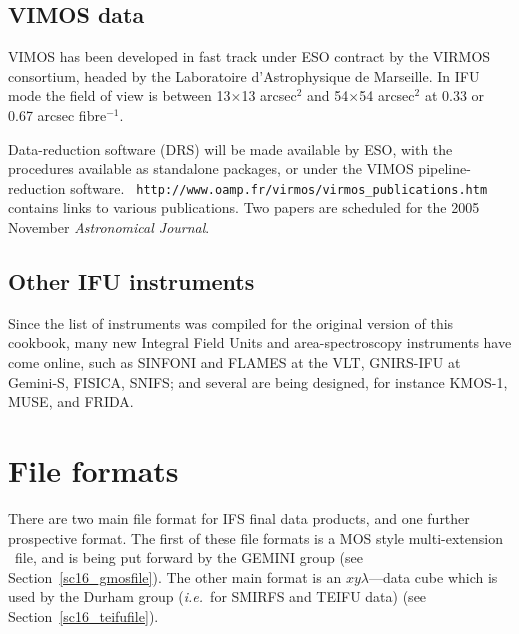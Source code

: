 \documentclass[twoside,11pt]{article}
\newcommand{\htmladdnormallink}[2]{#1}
\newcommand{\htmlref}[2]{#1}
\newcommand{\xlabel}[1]{}
\newcommand{\latex}[1]{#1}
\begin{document}
\subsection{\xlabel{sc16_vimos}VIMOS data\label{sc16_vimos}}

\htmladdnormallink{VIMOS}{http://www.eso.org/instruments/vimos/} has
been developed in fast track under ESO contract by the VIRMOS
consortium, headed by the Laboratoire d'Astrophysique de Marseille. In
IFU mode the field of view is between 13$\times$13 arcsec$^2$ and
54$\times$54 arcsec$^2$ at 0.33 or 0.67 arcsec fibre$^{-1}$.

Data-reduction software (DRS) will be made available by ESO, with the
procedures available as standalone packages, or under the VIMOS
pipeline-reduction software.\goodbreak
\htmladdnormallink{{\tt
http://www.oamp.fr/virmos/virmos\_publications.htm}}{http://www.oamp.fr/virmos/virmos_publications.htm}
contains links to various publications.  Two papers are scheduled for
the 2005 November {\em Astronomical Journal}.

\subsection{\xlabel{sc16_other}Other IFU instruments\label{sc16_other}}

Since the list of instruments was compiled for the original version of
this cookbook, many new Integral Field Units and area-spectroscopy
instruments have come online, such as
\htmladdnormallink{SINFONI}{http://www.eso.org/instruments/sinfoni/}
and \htmladdnormallink{FLAMES}{http://www.eso.org/instruments/flames/}
at the VLT,
\htmladdnormallink{GNIRS-IFU}{http://www.gemini.edu/sciops/instruments/nirs/nirsIndex.html}
at Gemini-S,
\htmladdnormallink{FISICA}{http://www.ctio.noao.edu/diroff/TALKS_PDF/Eikenberry_fisica_ctio05.pdf},
SNIFS; and several are being designed, for instance
\htmladdnormallink{KMOS-1}{http://www.cfai.dur.ac.uk/fix/projects/kmos1/kmos_main.html},
\htmladdnormallink{MUSE}{http://www.cfai.dur.ac.uk/fix/projects/muse/muse.html},
and FRIDA.

\newpage
\section{\xlabel{sc16_fileformat}File formats\label{sc16_fileformat}}

There are two main file format for IFS final data products, and one
further prospective format.  The \htmlref{first}{sc16_gmosfile} of
these file formats is a MOS style multi-extension 
\FITSref\ file, and is
being put forward by the GEMINI group\latex{ (see
Section~\ref{sc16_gmosfile})}.  The other main format is an
$xy\lambda$---\htmlref{data cube}{sc16_teifufile} which is used by the
Durham group (\emph{i.e.}\ for SMIRFS and TEIFU data)\latex{ (see
Section~\ref{sc16_teifufile})}.
\end{document}
